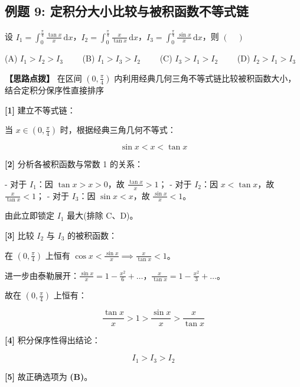 \documentclass[11pt,a4paper,UTF8]{ctexart}
\begin{document}
\subsection{例题 9: 定积分大小比较与被积函数不等式链}

设 $I_1 = \int_0^{\frac{\pi}{4}} \frac{\tan x}{x}\,\mathrm{d}x$，$I_2 = \int_0^{\frac{\pi}{4}} \frac{x}{\tan x}\,\mathrm{d}x$，$I_3 = \int_0^{\frac{\pi}{4}} \frac{\sin x}{x}\,\mathrm{d}x$，则 $(\quad)$

(A) $I_1 > I_2 > I_3 \qquad$ (B) $I_1 > I_3 > I_2 \qquad$ (C) $I_3 > I_1 > I_2 \qquad$ (D) $I_2 > I_1 > I_3$

\textbf{\color{DeepPurple}【思路点拨】} 在区间 $(0, \frac{\pi}{4})$ 内利用经典几何三角不等式链比较被积函数大小，结合定积分保序性直接排序


\begin{solbox}[分步推导与答题规范]
\textbf{[1]} 建立不等式链：

当 $x \in (0, \frac{\pi}{4})$ 时，根据经典三角几何不等式：


\begin{equation*}
\sin x < x < \tan x
\end{equation*}


\textbf{[2]} 分析各被积函数与常数 1 的关系：

- 对于 $I_1$：因 $\tan x > x > 0$，故 $\frac{\tan x}{x} > 1$；
- 对于 $I_2$：因 $x < \tan x$，故 $\frac{x}{\tan x} < 1$；
- 对于 $I_3$：因 $\sin x < x$，故 $\frac{\sin x}{x} < 1$。

由此立即锁定 $I_1$ 最大(排除 C、D)。

\textbf{[3]} 比较 $I_2$ 与 $I_3$ 的被积函数：

在 $(0, \frac{\pi}{4})$ 上恒有 $\cos x < \frac{\sin x}{x} \implies \frac{x}{\tan x} < 1$。

进一步由泰勒展开：$\frac{\sin x}{x} = 1 - \frac{x^2}{6} + \dots$，$\frac{x}{\tan x} = 1 - \frac{x^2}{3} + \dots$。

故在 $(0, \frac{\pi}{4})$ 上恒有：


\begin{equation*}
\frac{\tan x}{x} > 1 > \frac{\sin x}{x} > \frac{x}{\tan x}
\end{equation*}


\textbf{[4]} 积分保序性得出结论：


\begin{equation*}
I_1 > I_3 > I_2
\end{equation*}


\textbf{[5]} 故正确选项为 \textbf{(B)}。
\end{solbox}
\end{document}

